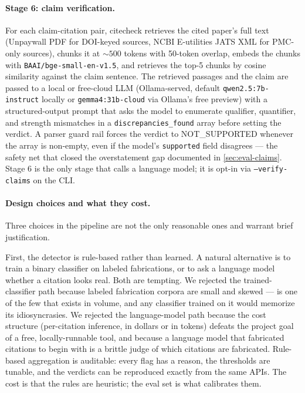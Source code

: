 \documentclass[12pt]{article}
\begin{document}
\paragraph{Stage 6: claim verification.} For each claim-citation pair, citecheck retrieves the cited paper's full text (Unpaywall PDF for DOI-keyed sources, NCBI E-utilities JATS XML for PMC-only sources), chunks it at ${\sim}500$ tokens with 50-token overlap, embeds the chunks with \texttt{BAAI/bge-small-en-v1.5}, and retrieves the top-5 chunks by cosine similarity against the claim sentence. The retrieved passages and the claim are passed to a local or free-cloud LLM (Ollama-served, default \texttt{qwen2.5:7b-instruct} locally or \texttt{gemma4:31b-cloud} via Ollama's free preview) with a structured-output prompt that asks the model to enumerate qualifier, quantifier, and strength mismatches in a \texttt{discrepancies\_found} array before setting the verdict. A parser guard rail forces the verdict to NOT\_SUPPORTED whenever the array is non-empty, even if the model's \texttt{supported} field disagrees --- the safety net that closed the overstatement gap documented in \cref{sec:eval-claims}. Stage 6 is the only stage that calls a language model; it is opt-in via \texttt{--verify-claims} on the CLI.

\paragraph{Design choices and what they cost.} Three choices in the pipeline are not the only reasonable ones and warrant brief justification.

First, the detector is rule-based rather than learned. A natural alternative is to train a binary classifier on labeled fabrications, or to ask a language model whether a citation looks real. Both are tempting. We rejected the trained-classifier path because labeled fabrication corpora are small and skewed --- \citet{walters_wilder_2023} is one of the few that exists in volume, and any classifier trained on it would memorize its idiosyncrasies. We rejected the language-model path because the cost structure (per-citation inference, in dollars or in tokens) defeats the project goal of a free, locally-runnable tool, and because a language model that fabricated citations to begin with is a brittle judge of which citations are fabricated. Rule-based aggregation is auditable: every flag has a reason, the thresholds are tunable, and the verdicts can be reproduced exactly from the same APIs. The cost is that the rules are heuristic; the eval set is what calibrates them.
\end{document}
